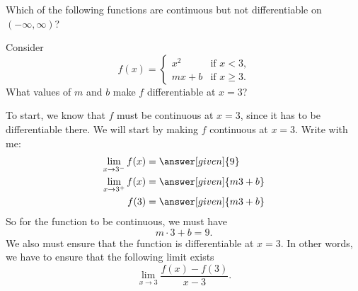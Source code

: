\documentclass{ximera}
\begin{document}
\begin{question}
	Which of the following functions are continuous but not
	differentiable on $(-\infty, \infty)$?
	  \begin{multipleChoice}
	  \end{multipleChoice}
\end{question}

\begin{example}
	  Consider
	  \[ f(x) = \begin{cases}
	          x^2 &\text{if $x<3$,}\\
	          mx+b &\text{if $x\ge 3$.}
	         \end{cases} \]
	  What values of $m$ and $b$ make $f$ differentiable at $x=3$?
	  \begin{explanation}
		    To start, we know that  $f$ must be continuous at $x=3$, since it has to be
		    differentiable there. We will start by making $f$  continuous at
		    $x=3$. Write with me:
		    \begin{align*}
			      \lim_{x\to 3^-} f(x) &= \answer[given]{9}\\
			      \lim_{x\to 3^+} f(x) &= \answer[given]{m 3 + b}\\
			      f(3) &= \answer[given]{m 3 + b}
		    \end{align*}
		    So for the function to be continuous, we must have
		    \[ m\cdot 3 + b =9.\]
		    We also must ensure that the function is differentiable at $x=3$. In other words, we have to ensure that the following limit exists
		 \[ \lim_{x\to 3}\frac{f(x)-f(3)}{x-3}.\]
		

\end{explanation}
\end{example}
\end{document}
